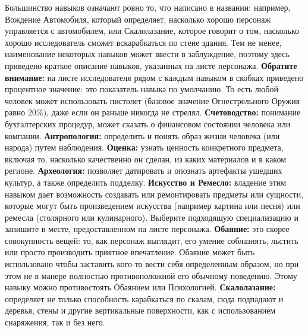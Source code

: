 \documentclass[letterpaper,twocolumn,openany, twoside, 11pt, usenames]{cocbook}
\begin{document}
\begin{fullcocpaperbox}{}{}
  \begin{multicols}{3}
  Большинство навыков означают ровно то, что написано в названии: например, Вождение Автомобиля, который определяет, насколько хорошо персонаж управляется с автомобилем, или Скалолазание, которое говорит о том, насколько хорошо исследователь сможет вскарабкаться по стене здания. Тем не менее, наименование некоторых навыков может ввести в заблуждение, поэтому здесь приведено краткое описание навыков, указанных на листе персонажа.
  \smallbreak
  \textbf{Обратите внимание:} на листе исследователя рядом с каждым навыком в скобках приведено процентное значение: это показатель навыка по умолчанию. То есть любой человек может использовать пистолет (базовое значение Огнестрельного Оружия равно 20\%), даже если он раньше никогда не стрелял.
  \smallbreak
  \textbf{Счетоводство:} понимание бухгалтерских процедур, может сказать о финансовом состоянии человека или компании.
  \smallbreak
  \textbf{Антропология:} определить и понять образ жизни человека (или народа) путем наблюдения.
  \smallbreak
  \textbf{Оценка:} узнать ценность конкретного предмета, включая то, насколько качественно он сделан, из каких материалов и в каком регионе.
  \smallbreak
  \textbf{Археология:} позволяет датировать и опознать артефакты ушедших культур, а также определить подделку.
  \smallbreak
  \textbf{Искусство и Ремесло:} владение этим навыком дает возможность создавать или ремонтировать предметы или сущности, которые могут быть произведением искусства (например картина или песня) или ремесла (столярного или кулинарного). Выберите подходящую специализацию и запишите в месте, предоставленном на листе персонажа.
  \smallbreak
  \textbf{Обаяние:} это скорее совокупность вещей: то, как персонаж выглядит, его умение соблазнять, льстить или просто производить приятное впечатление. Обаяние может быть использовано чтобы заставить кого-то вести себя определенным образом, но при этом не в манере полностью противоположной его обычному поведению. Этому навыку можно противостоять Обаянием или Психологией.
  \smallbreak
  \textbf{Скалолазание:} определяет не только способность карабкаться по скалам, сюда подпадают и деревья, стены и другие вертикальные поверхности, как с использованием снаряжения, так и без него.

\end{multicols}
\end{fullcocpaperbox}
\end{document}
